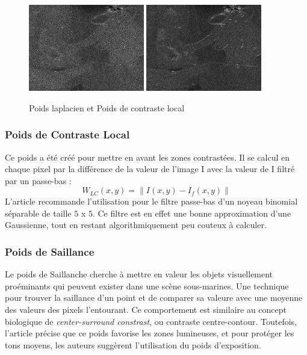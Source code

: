 \documentclass[twoside]{article}
\begin{document}
\begin{figure}[]
  \centering
  \includegraphics[width=0.45\textwidth]{Support/laplacian.png}
  \includegraphics[width=0.45\textwidth]{Support/lc.png}

  \caption{Poids laplacien et Poids de contraste local}
\end{figure}

\subsubsection{Poids de Contraste Local}

Ce poids a été créé pour mettre en avant les zones contrastées. Il se calcul en chaque pixel par la différence de la valeur de l'image I avec la valeur de I filtré par un passe-bas : $$ W_{LC}(x,y) = \|I(x,y) - I_{f}(x,y)\| $$
L'article recommande l'utilisation pour le filtre passe-bas d'un noyeau binomial séparable de taille $5$ x $5$. Ce filtre est en effet une bonne approximation d'une Gaussienne, tout en restant algorithmiquement peu couteux à calculer.

\subsubsection{Poids de Saillance}
Le poids de Saillanche cherche à mettre en valeur les objets visuellement proéminants qui peuvent exister dans une scène sous-marines. Une technique pour trouver la saillance d'un point et de comparer sa valeure avec une moyenne des valeurs des pixels l'entourant. Ce comportement est similaire au concept biologique de \emph{center-surround constrast}, ou contraste centre-contour. Toutefois, l'article précise que ce poids favorise les zones lumineuses, et pour protéger les tons moyens, les auteurs suggèrent l'utilisation du poids d'exposition.
\end{document}
